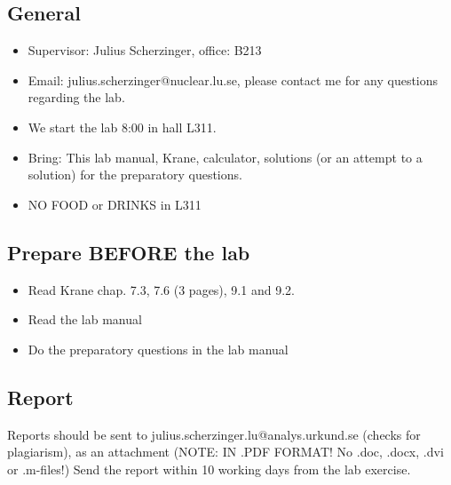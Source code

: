\documentclass[a4,11pt, notitlepage]{article}
\begin{document}
\subsection{General}

\begin{itemize}
\item Supervisor: Julius Scherzinger, office: B213
\item Email: julius.scherzinger@nuclear.lu.se, please contact me for any questions regarding the lab. 
\item We start the lab 8:00 in hall L311. 
\item Bring: This lab manual, Krane, calculator, solutions (or an attempt to a solution) for the preparatory questions. 
\item NO FOOD or DRINKS in L311
\end{itemize}



\subsection{Prepare BEFORE the lab}

\begin{itemize}
\item Read Krane chap. 7.3, 7.6 (3 pages), 9.1 and 9.2. 
\item Read the lab manual
\item Do the preparatory questions in the lab manual
\end{itemize}



\subsection{Report}

Reports should be sent to julius.scherzinger.lu@analys.urkund.se (checks for plagiarism), as an attachment (NOTE: IN .PDF FORMAT! No .doc, .docx, .dvi or .m-files!)
Send the report within 10 working days from the lab exercise. 
\end{document}
